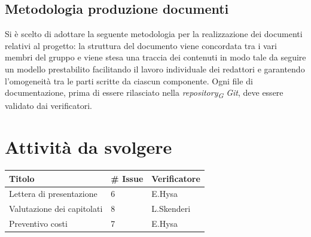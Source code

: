 \documentclass{article}
\begin{document}
    \subsection{Metodologia produzione documenti}
        Si è scelto di adottare la seguente metodologia per la realizzazione dei documenti relativi al progetto: la struttura del documento viene concordata tra i vari membri del gruppo e viene stesa una traccia dei contenuti in modo tale da seguire un modello prestabilito facilitando il lavoro individuale dei redattori e garantendo l’omogeneità tra le parti scritte da ciascun componente. Ogni file di documentazione, prima di essere rilasciato nella \textit{repository}\textsubscript{\textit{G}} \textit{Git}, deve essere validato dai verificatori. 

\section{Attività da svolgere}
    \begin{center}
        \begin{tabular}{|C{7cm}|C{1,5cm}|C{3cm}|}
            \hline
            \textbf{Titolo} & \textbf{\# Issue} & \textbf{Verificatore} \\
            \hline\hline
            Lettera di presentazione & 6 & E.Hysa\\
            Valutazione dei capitolati & 8 & L.Skenderi\\ Preventivo costi & 7 & E.Hysa\\
            \hline
        \end{tabular}
    \end{center}
\end{document}
